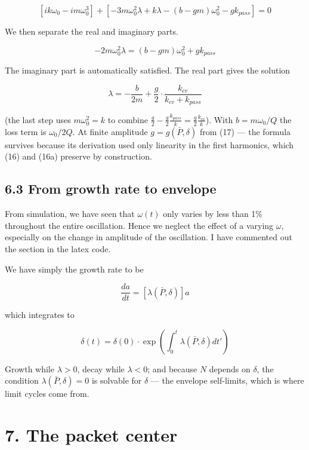 \documentclass[11pt]{article}
\begin{document}
\[
\left[ik\omega_0 - im\omega_0^3\right] + \left[-3m\omega_0^2\lambda + k\lambda - (b - gm)\omega_0^2 - gk_{pass}\right] = 0
\]

We then separate the real and imaginary parts.

\[
-2m\omega_0^2\lambda = (b - gm)\omega_0^2 + gk_{pass}
\]

The imaginary part is automatically satisfied. The real part gives the solution

\begin{equation}
\lambda = -\frac{b}{2m} + \frac{g}{2}\cdot\frac{k_{cv}}{k_{cv}+k_{pass}} \tag{20}
\end{equation}

(the last step uses $m\omega_0^2 = k$ to combine $\frac g2 - \frac g2\frac{k_{pass}}{k} = \frac g2\frac{k_{cv}}{k}$). With $b = m\omega_0/Q$ the loss term is $\omega_0/2Q$. At finite amplitude $g = g(\bar P, \delta)$ from (17) --- the formula survives because its derivation used only linearity in the first harmonics, which (16) and (16a) preserve by construction.

\subsection*{6.3 From growth rate to envelope}

From simulation, we have seen that $\omega(t)$ only varies by less than 1\% throughout the entire oscillation. Hence we neglect the effect of a varying $\omega$, especially on the change in amplitude of the oscillation. I have commented out the section in the latex code.

We have simply the growth rate to be

\begin{equation}
\frac{da}{dt} = \left[\lambda(\bar P, \delta)\right]a \tag{21}
\end{equation}

which integrates to

\begin{equation}
\delta(t) = \delta(0)\cdot\exp\left(\int_0^t\lambda(\bar P,\delta)dt'\right) \tag{22}
\end{equation}

Growth while $\lambda > 0$, decay while $\lambda < 0$; and because $N$ depends on $\delta$, the condition $\lambda(\bar P, \delta) = 0$ is solvable for $\delta$ --- the envelope self-limits, which is where limit cycles come from.

\section*{7. The packet center}
\end{document}
